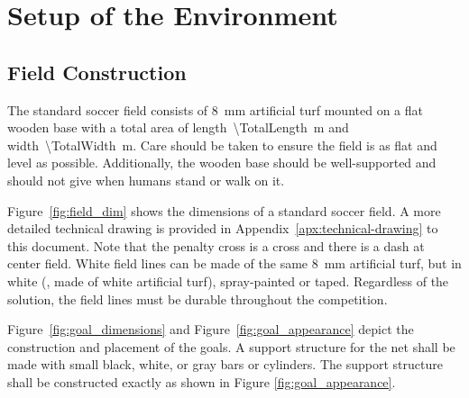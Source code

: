 \section{Setup of the Environment}
\label{sec:setup_environment}

\subsection{Field Construction}
\label{sec:field_dim}

The standard soccer field consists of \qty{8}{\milli\metre} artificial turf mounted on a flat wooden base with a total area of length~\qty{\TotalLength}{\metre} and width~\qty{\TotalWidth}{\metre}. Care should be taken to ensure the field is as flat and level as possible. Additionally, the wooden base should be well-supported and should not give when humans stand or walk on it.

Figure~\ref{fig:field_dim} shows the dimensions of a standard soccer field.
A more detailed technical drawing is provided in Appendix~\ref{apx:technical-drawing} to this document.
Note that the penalty cross is a cross and there is a dash at center field. White field lines can be made of the same \qty{8}{\milli\metre} artificial turf, but in white (\ie, made of white artificial turf), spray-painted or taped. Regardless of the solution, the field lines must be durable throughout the competition.

Figure~\ref{fig:goal_dimensions} and Figure~\ref{fig:goal_appearance} depict the construction and placement of the goals. A support structure for the net shall be made with small black, white, or gray bars or cylinders.  The support structure shall be constructed exactly as shown in Figure \ref{fig:goal_appearance}.

